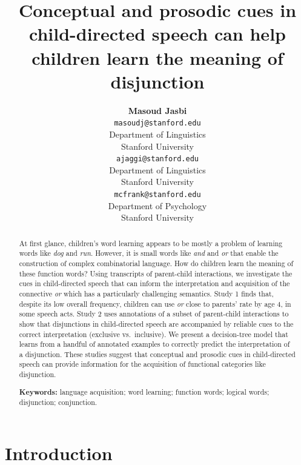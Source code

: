 \documentclass[10pt, letterpaper]{article}
\title{Conceptual and prosodic cues in child-directed speech can help children
learn the meaning of disjunction}
\author{{\large \bf Masoud Jasbi} \\ \texttt{masoudj@stanford.edu} \\ Department of Linguistics \\ Stanford University \And {\large \bf Akshay Jaggi} \\ \texttt{ajaggi@stanford.edu} \\ Department of Linguistics \\ Stanford University \And {\large \bf Michael C. Frank} \\ \texttt{mcfrank@stanford.edu} \\ Department of Psychology \\ Stanford University }
\begin{document}
\maketitle

\begin{abstract}
At first glance, children's word learning appears to be mostly a problem
of learning words like \emph{dog} and \emph{run}. However, it is small
words like \emph{and} and \emph{or} that enable the construction of
complex combinatorial language. How do children learn the meaning of
these function words? Using transcripts of parent-child interactions, we
investigate the cues in child-directed speech that can inform the
interpretation and acquisition of the connective \emph{or} which has a
particularly challenging semantics. Study 1 finds that, despite its low
overall frequency, children can use \emph{or} close to parents' rate by
age 4, in some speech acts. Study 2 uses annotations of a subset of
parent-child interactions to show that disjunctions in child-directed
speech are accompanied by reliable cues to the correct interpretation
(exclusive vs.~inclusive). We present a decision-tree model that learns
from a handful of annotated examples to correctly predict the
interpretation of a disjunction. These studies suggest that conceptual
and prosodic cues in child-directed speech can provide information for
the acquisition of functional categories like disjunction.

\textbf{Keywords:}
language acquisition; word learning; function words; logical words;
disjunction; conjunction.
\end{abstract}

\section{Introduction}\label{introduction}
\end{document}
